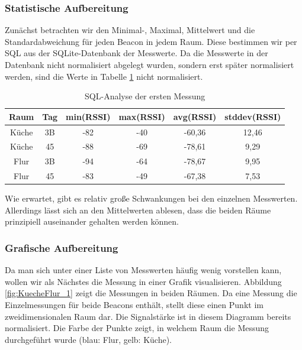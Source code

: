 \subsubsection{Statistische Aufbereitung}

Zunächst betrachten wir den Minimal-, Maximal, Mittelwert und die Standardabweichung für jeden
Beacon in jedem Raum. Diese bestimmen wir per SQL aus der SQLite-Datenbank der Messwerte.
Da die Messwerte in der Datenbank nicht normalisiert abgelegt wurden, sondern erst später
normalisiert werden, sind die Werte in Tabelle \ref{tab:sql-analyze} nicht normalisiert.

\begin{table}[h]
	\caption{SQL-Analyse der ersten Messung}
	\label{tab:sql-analyze}
	\begin{tabular}{|c|c|c|c|c|c|}
		\hline \textbf{Raum} & \textbf{Tag} & \textbf{min(RSSI)} & \textbf{max(RSSI)} & \textbf{avg(RSSI)} & \textbf{stddev(RSSI)} \\
		\hline 
		\hline Küche  & 3B & -82 & -40 & -60,36 & 12,46 \\ 
		\hline Küche & 45 & -88 & -69 & -78,61 & 9,29 \\ 
		\hline Flur & 3B & -94 & -64 & -78,67 & 9,95 \\ 
		\hline Flur & 45 & -83 & -49 & -67,38 & 7,53 \\ 
		\hline 
	\end{tabular}
\end{table}


\vspace{0.4cm}
Wie erwartet, gibt es relativ große Schwankungen bei den einzelnen Messwerten.
Allerdings lässt sich an den Mittelwerten ablesen, dass die beiden Räume
prinzipiell auseinander gehalten werden können.

\subsubsection{Grafische Aufbereitung}
\label{sec:lok-grafische-aufbereitung}

Da man sich unter einer Liste von Messwerten häufig wenig vorstellen kann,
wollen wir als Nächstes die Messung in einer Grafik visualisieren.
Abbildung \ref{fig:KuecheFlur_1} zeigt die Messungen in beiden Räumen.
Da eine Messung die Einzelmessungen für beide Beacons enthält, stellt diese
einen Punkt im zweidimensionalen Raum dar. Die Signalstärke ist in diesem
Diagramm bereits normalisiert. Die Farbe der Punkte zeigt, in welchem Raum
die Messung durchgeführt wurde (blau: Flur, gelb: Küche).

